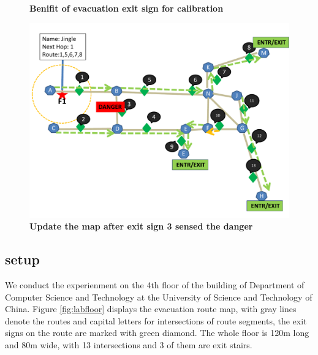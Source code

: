\documentclass[conference]{IEEEtran}
\begin{document}
\begin{figure}[h]
\label{fig:rawIMU}
\centering
{}
\caption{\bf Benifit of evacuation exit sign for calibration}
\end{figure}

  \begin{figure}[ht]
  \label{fig:labfloorRepNew}
  \includegraphics[width=1 \linewidth]{pic/floorplanRepNew.pdf}
  \caption{\bf Update the map after exit sign 3 sensed the danger}
  \end{figure}   

  \subsection{setup}
  We conduct the experienment on the 4th floor of the building of Department of Computer Science and Technology at the University of Science and Technology of China. Figure \ref{fig:labfloor} displays the evacuation route map, with gray lines denote the routes and capital letters for intersections of route segments, the exit signs on the route are marked with green diamond. The whole floor is 120m long and 80m wide, with 13 intersections and 3 of them are exit stairs. 
\end{document}
